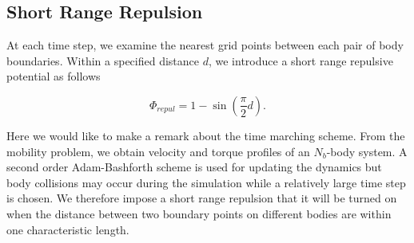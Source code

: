 \documentclass[lineno]{jfm}
\begin{document}
\subsection{Short Range Repulsion}

At each time step, we examine the nearest grid points between each pair of body  boundaries. Within a specified distance $d$, we introduce a short range repulsive potential as follows

\begin{equation}
\Phi_{repul} = 1- \sin\left(\frac{\pi}{2} d\right).
\end{equation}

Here we would like to make a remark about the time marching scheme. From the mobility problem, we obtain velocity and torque profiles of an $N_b$-body system. A second order Adam-Bashforth scheme is used for updating the dynamics but body collisions may occur during the simulation while a relatively large time step is chosen. We therefore impose a short range repulsion that it will be turned on when the distance between two boundary points on different bodies are within one characteristic length.


\end{document}
